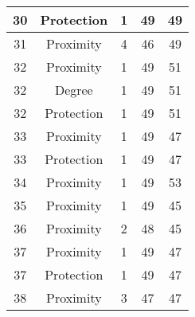 \documentclass[results.tex]{subfiles}
\begin{document}
\begin{center}
\begin{tabular}{| c || c | c | c | c |}
            \hline
            30                      & Protection                   & 1                      & 49                      & 49                   \\
            \hline
            31                      & Proximity                    & 4                      & 46                      & 49                   \\
            \hline
            32                      & Proximity                    & 1                      & 49                      & 51                   \\
            \hline
            32                      & Degree                       & 1                      & 49                      & 51                   \\
            \hline
            32                      & Protection                   & 1                      & 49                      & 51                   \\
            \hline
            33                      & Proximity                    & 1                      & 49                      & 47                   \\
            \hline
            33                      & Protection                   & 1                      & 49                      & 47                   \\
            \hline
            34                      & Proximity                    & 1                      & 49                      & 53                   \\
            \hline
            35                      & Proximity                    & 1                      & 49                      & 45                   \\
            \hline
            36                      & Proximity                    & 2                      & 48                      & 45                   \\
            \hline
            37                      & Proximity                    & 1                      & 49                      & 47                   \\
            \hline
            37                      & Protection                   & 1                      & 49                      & 47                   \\
            \hline
            38                      & Proximity                    & 3                      & 47                      & 47                   \\

\end{tabular}
\end{center}
\end{document}
